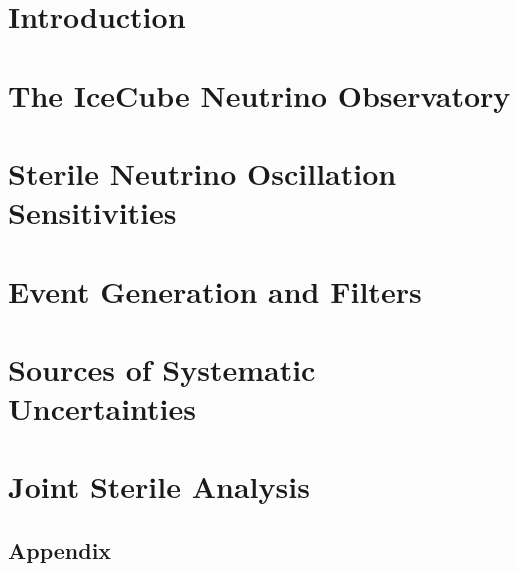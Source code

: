 \documentclass[
11pt, 
english, 
doublespacing, %
headsepline, %
usenames,dvipsnames
]{dissertation_class} %
\numberwithin{figure}{section}
\numberwithin{table}{section}
\numberwithin{equation}{section}
\begin{document}
\tableofcontents


\chapter{Introduction}\label{chapter:intro}


\chapter{The IceCube Neutrino Observatory}\label{chapter:icecube}



\chapter{Sterile Neutrino Oscillation Sensitivities}\label{chapter:sense}


\chapter{Event Generation and Filters}\label{chapter:gen}

%

\chapter{Sources of Systematic Uncertainties}\label{chapter:unc}



\chapter{Joint Sterile Analysis}\label{chapter:res}

% 

% 


\begin{appendices}

    \chapter{Appendix}\label{chapter:appendix}
    
    
\end{appendices}

\end{document}
